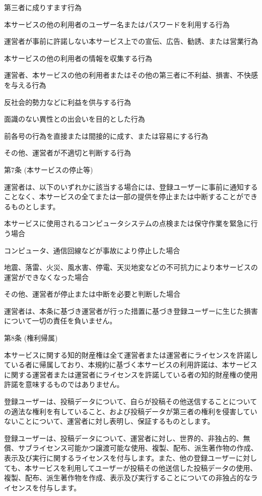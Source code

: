     第三者に成りすます行為

    本サービスの他の利用者のユーザー名またはパスワードを利用する行為

    運営者が事前に許諾しない本サービス上での宣伝、広告、勧誘、または営業行為

    本サービスの他の利用者の情報を収集する行為

    運営者、本サービスの他の利用者またはその他の第三者に不利益、損害、不快感を与える行為

    反社会的勢力などに利益を供与する行為

    面識のない異性との出会いを目的とした行為

    前各号の行為を直接または間接的に成す、または容易にする行為

    その他、運営者が不適切と判断する行為

第7条 (本サービスの停止等)

    運営者は、以下のいずれかに該当する場合には、登録ユーザーに事前に通知することなく、本サービスの全てまたは一部の提供を停止または中断することができるものとします。

        本サービスに使用されるコンピュータシステムの点検または保守作業を緊急に行う場合

        コンピュータ、通信回線などが事故により停止した場合

        地震、落雷、火災、風水害、停電、天災地変などの不可抗力により本サービスの運営ができなくなった場合

        その他、運営者が停止または中断を必要と判断した場合

    運営者は、本条に基づき運営者が行った措置に基づき登録ユーザーに生じた損害について一切の責任を負いません。

第8条 (権利帰属)

    本サービスに関する知的財産権は全て運営者または運営者にライセンスを許諾している者に帰属しており、本規約に基づく本サービスの利用許諾は、本サービスに関する運営者または運営者にライセンスを許諾している者の知的財産権の使用許諾を意味するものではありません。

    登録ユーザーは、投稿データについて、自らが投稿その他送信することについての適法な権利を有していること、および投稿データが第三者の権利を侵害していないことについて、運営者に対し表明し、保証するものとします。

    登録ユーザーは、投稿データについて、運営者に対し、世界的、非独占的、無償、サブライセンス可能かつ譲渡可能な使用、複製、配布、派生著作物の作成、表示及び実行に関するライセンスを付与します。また、他の登録ユーザーに対しても、本サービスを利用してユーザーが投稿その他送信した投稿データの使用、複製、配布、派生著作物を作成、表示及び実行することについての非独占的なライセンスを付与します。

